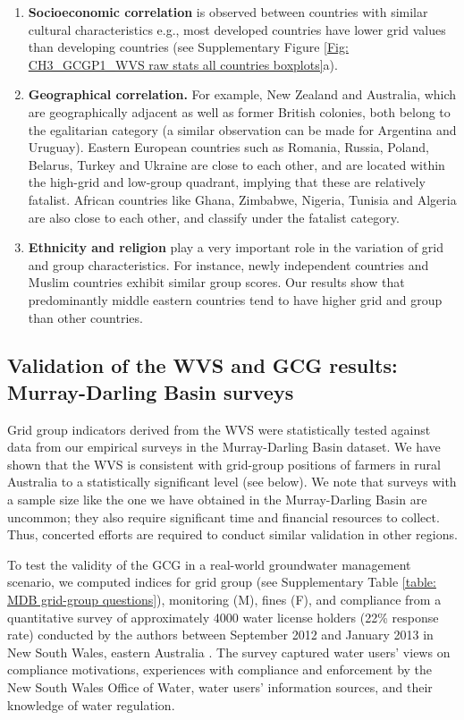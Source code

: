 \documentclass[12pt, a4paper]{article}
\begin{document}
\begin{enumerate}
	\item \textbf{Socioeconomic correlation} is observed between countries with similar cultural characteristics e.g., most developed countries have lower grid values than developing countries (see Supplementary Figure \ref{Fig: CH3_GCGP1_WVS raw stats all countries boxplots}a).
	\item \textbf{Geographical correlation.}  For example, New Zealand and Australia, which are geographically adjacent as well as former British colonies, both belong to the egalitarian category (a similar observation can be made for Argentina and Uruguay). Eastern European countries such as Romania, Russia, Poland, Belarus, Turkey and Ukraine are close to each other, and are located within the high-grid and low-group quadrant, implying that these are relatively fatalist. African countries like Ghana, Zimbabwe, Nigeria, Tunisia and Algeria are also close to each other, and classify under the fatalist category.
	\item \textbf{Ethnicity and religion} play a very important role in the variation of grid and group characteristics. For instance, newly independent countries and Muslim countries exhibit similar group scores. Our results show that predominantly middle eastern countries tend to have higher grid and group than other countries.
\end{enumerate}

\subsection{Validation of the WVS and GCG results: Murray-Darling Basin surveys}

Grid group indicators derived from the WVS were statistically tested against data from our empirical surveys in the Murray-Darling Basin dataset. We have shown that the WVS is consistent with grid-group positions of farmers in rural Australia to a statistically significant level (see below). We note that surveys with a sample size like the one we have obtained in the Murray-Darling Basin are uncommon; they also require significant time and financial resources to collect. Thus, concerted efforts are required to conduct similar validation in other regions. 

To test the validity of the GCG in a real-world groundwater management scenario, we computed indices for grid group (see Supplementary Table \ref{table: MDB grid-group questions}), monitoring (M), fines (F), and compliance from a quantitative survey of approximately 4000 water license holders (22\% response rate) conducted by the authors between September 2012 and January 2013 in New South Wales, eastern Australia \autocite{Holley:2015te}. The survey captured water users’ views on compliance motivations, experiences with compliance and enforcement by the New South Wales Office of Water, water users’ information sources, and their knowledge of water regulation. 
\end{document}
